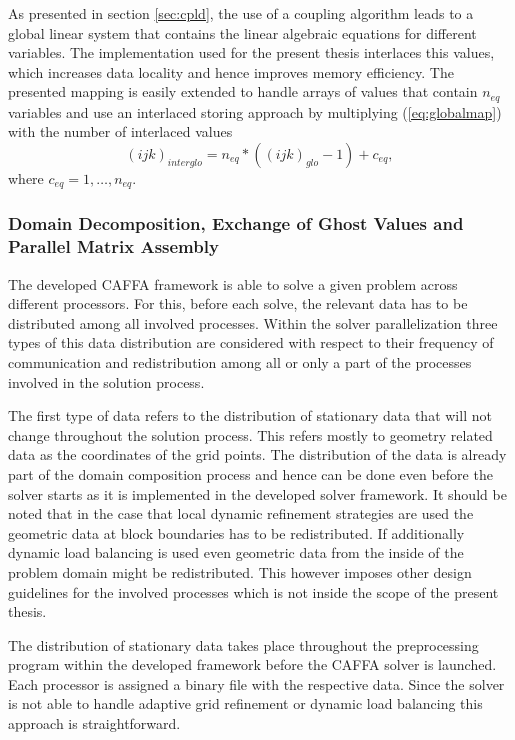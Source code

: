 As presented in section \ref{sec:cpld}, the use of a coupling algorithm leads to a global linear system that contains the linear algebraic equations for different variables. The implementation used for the present thesis interlaces this values, which increases data locality and hence improves memory efficiency. The presented mapping is easily extended to handle arrays of values that contain \(n_{eq}\) variables and use an interlaced storing approach by multiplying (\ref{eq:globalmap}) with the number of interlaced values
\begin{displaymath}
  (ijk)_{interglo} = n_{eq} * \left( (ijk)_{glo}  - 1 \right) + c_{eq},
\end{displaymath}
where \(c_{eq} = 1,\dots,n_{eq} \).

\subsubsection{Domain Decomposition, Exchange of Ghost Values and Parallel Matrix Assembly}

The developed CAFFA framework is able to solve a given problem across different processors. For this, before each solve, the relevant data has to be distributed among all involved processes. Within the solver parallelization three types of this data distribution are considered with respect to their frequency of communication and redistribution among all or only a part of the processes involved in the solution process. 

The first type of data refers to the distribution of stationary data that will not change throughout the solution process. This refers mostly to geometry related data as the coordinates of the grid points. The distribution of the data is already part of the domain composition process and hence can be done even before the solver starts as it is implemented in the developed solver framework. It should be noted that in the case that local dynamic refinement strategies are used the geometric data at block boundaries has to be redistributed. If additionally dynamic load balancing is used even geometric data from the inside of the problem domain might be redistributed. This however imposes other design guidelines for the involved processes which is not inside the scope of the present thesis.

The distribution of stationary data takes place throughout the preprocessing program within the developed framework before the CAFFA solver is launched. Each processor is assigned a binary file with the respective data. Since the solver is not able to handle adaptive grid refinement or dynamic load balancing this approach is straightforward.

